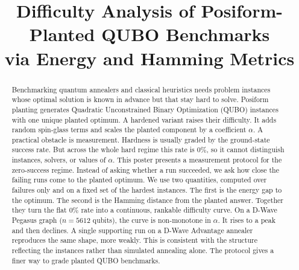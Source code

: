 \documentclass[10pt, conference]{IEEEtran}
\begin{document}
\title{Difficulty Analysis of Posiform-Planted QUBO Benchmarks\\
via Energy and Hamming Metrics}

\author{
\and
{}
}
\maketitle
\renewcommand{\thefootnote}{}
\renewcommand{\thefootnote}{\arabic{footnote}}

\begin{abstract}
Benchmarking quantum annealers and classical heuristics needs problem instances
whose optimal solution is known in advance but that stay hard to solve. Posiform
planting generates Quadratic Unconstrained Binary Optimization (QUBO) instances
with one unique planted optimum. A hardened variant raises their difficulty. It
adds random spin-glass terms and scales the planted component by a coefficient
$\alpha$. A practical obstacle is measurement. Hardness is usually graded by the
ground-state success rate. But across the whole hard regime this rate is $0\%$,
so it cannot distinguish instances, solvers, or values of $\alpha$. This poster
presents a measurement protocol for the zero-success regime. Instead of asking
whether a run succeeded, we ask how close the failing runs come to the planted
optimum. We use two quantities, computed over failures only and on a fixed set
of the hardest instances. The first is the energy gap to the optimum. The second
is the Hamming distance from the planted answer. Together they turn the flat
$0\%$ rate into a continuous, rankable difficulty curve. On a D-Wave Pegasus
graph ($n=5612$ qubits), the curve is non-monotone in $\alpha$. It rises to a
peak and then declines. A single supporting run on a D-Wave Advantage annealer
reproduces the same shape, more weakly. This is consistent with the structure
reflecting the instances rather than simulated annealing alone. The protocol
gives a finer way to grade planted QUBO benchmarks.
\end{abstract}
\end{document}
